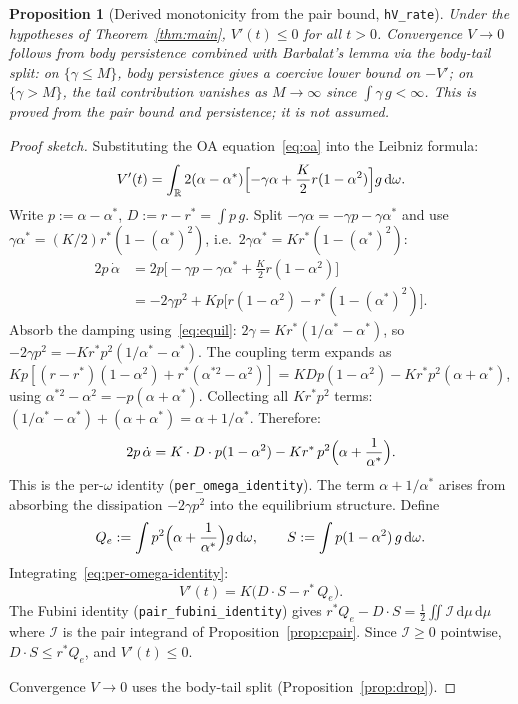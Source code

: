 \documentclass[11pt,a4paper]{article}
\newtheorem{proposition}[theorem]{Proposition}
\theoremstyle{definition}
\newcommand{\R}{\mathbb{R}}
\begin{document}
\begin{proposition}[Derived monotonicity from the pair bound, \texttt{hV\_rate}]\label{prop:rate}
Under the hypotheses of Theorem~\ref{thm:main}, $V'(t) \leq 0$ for all $t > 0$. Convergence $V \to 0$ follows from body persistence combined with Barbalat's lemma via the body-tail split: on $\{\gamma \leq M\}$, body persistence gives a coercive lower bound on $-V'$; on $\{\gamma > M\}$, the tail contribution vanishes as $M \to \infty$ since $\int \gamma\,g < \infty$. This is \emph{proved} from the pair bound and persistence; it is not assumed.
\end{proposition}

\begin{proof}[Proof sketch]
Substituting the OA equation~\eqref{eq:oa} into the Leibniz formula:
\[
V'(t) = \int_\R 2(\alpha - \alpha^*)\Bigl[-\gamma\alpha + \frac{K}{2}r(1-\alpha^2)\Bigr] g\,\mathrm{d}\omega.
\]
Write $p := \alpha - \alpha^*$, $D := r - r^* = \int p\,g$. Split $-\gamma\alpha = -\gamma p - \gamma\alpha^*$ and use $\gamma\alpha^* = (K/2)r^*(1-(\alpha^*)^2)$, i.e.\ $2\gamma\alpha^* = Kr^*(1-(\alpha^*)^2)$:
\begin{align*}
2p\,\dot\alpha
&= 2p\bigl[-\gamma p - \gamma\alpha^* + \tfrac{K}{2}r(1-\alpha^2)\bigr] \\
&= -2\gamma p^2 + Kp\bigl[r(1-\alpha^2) - r^*(1-(\alpha^*)^2)\bigr].
\end{align*}
Absorb the damping using~\eqref{eq:equil}: $2\gamma = Kr^*(1/\alpha^* - \alpha^*)$, so $-2\gamma p^2 = -Kr^*p^2(1/\alpha^* - \alpha^*)$. The coupling term expands as $Kp[(r-r^*)(1-\alpha^2) + r^*(\alpha^{*2}-\alpha^2)] = K D p(1-\alpha^2) - Kr^*p^2(\alpha+\alpha^*)$, using $\alpha^{*2}-\alpha^2 = -p(\alpha+\alpha^*)$. Collecting all $Kr^*p^2$ terms: $(1/\alpha^* - \alpha^*) + (\alpha+\alpha^*) = \alpha + 1/\alpha^*$. Therefore:
\begin{equation}\label{eq:per-omega-identity}
2p\,\dot\alpha = K\cdot D\cdot p(1-\alpha^2) - Kr^*\,p^2\Bigl(\alpha + \frac{1}{\alpha^*}\Bigr).
\end{equation}
This is the per-$\omega$ identity (\texttt{per\_omega\_identity}). The term $\alpha + 1/\alpha^*$ arises from absorbing the dissipation $-2\gamma p^2$ into the equilibrium structure. Define
\[
Q_e := \int p^2\Bigl(\alpha + \frac{1}{\alpha^*}\Bigr)g\,\mathrm{d}\omega, \qquad
S := \int p(1-\alpha^2)\,g\,\mathrm{d}\omega.
\]
Integrating~\eqref{eq:per-omega-identity}:
\begin{equation}\label{eq:Vprime-QeDS}
V'(t) = K\bigl(D\cdot S - r^*\,Q_e\bigr).
\end{equation}
The Fubini identity (\texttt{pair\_fubini\_identity}) gives $r^*Q_e - D\cdot S = \frac{1}{2}\iint \mathcal{I}\,\mathrm{d}\mu\,\mathrm{d}\mu$ where $\mathcal{I}$ is the pair integrand of Proposition~\ref{prop:cpair}. Since $\mathcal{I} \geq 0$ pointwise, $D\cdot S \leq r^*Q_e$, and $V'(t) \leq 0$.

Convergence $V \to 0$ uses the body-tail split (Proposition~\ref{prop:drop}).
\end{proof}
\end{document}
